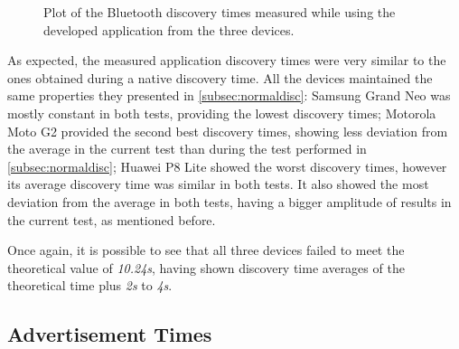 \begin{figure}[ht]
	\noindent{}
	\caption{\label{fig:appdisc} Plot of the Bluetooth discovery times measured while using the developed application from the three devices.}
\end{figure}

As expected, the measured application discovery times were very similar to the ones obtained during a native discovery time. All the devices maintained the same properties they presented in \ref{subsec:normaldisc}: Samsung Grand Neo was mostly constant in both tests, providing the lowest discovery times; Motorola Moto G2 provided the second best discovery times, showing less deviation from the average in the current test than during the test performed in \ref{subsec:normaldisc}; Huawei P8 Lite showed the worst discovery times, however its average discovery time was similar in both tests. It also showed the most deviation from the average in both tests, having a bigger amplitude of results in the current test, as mentioned before.

Once again, it is possible to see that all three devices failed to meet the theoretical value of \textit{10.24s}, having shown discovery time averages of the theoretical time plus \textit{2s} to \textit{4s}.

\subsection{Advertisement Times}

